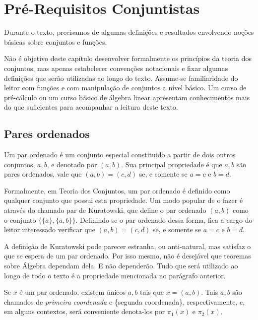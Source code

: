 
\chapter{Pré-Requisitos Conjuntistas}
Durante o texto, precisamos de algumas definições e resultados envolvendo noções básicas sobre conjuntos e funções.

Não é objetivo deste capítulo desenvolver formalmente os princípios da teoria dos conjuntos, mas apenas estabelecer convenções notacionais e fixar algumas definições que serão utilizadas ao longo do texto. Assume-se familiaridade do leitor com funções e com manipulação de conjuntos a nível básico.
Um curso de pré-cálculo ou um curso básico de álgebra linear apresentam conhecimentos mais do que suficientes para acompanhar a leitura deste texto.

\section{Pares ordenados}
Um par ordenado é um conjunto especial constituido a partir de dois outros conjuntos, $a, b$, e denotado por $(a, b)$.
Sua principal propriedade é que $a, b$ são pares ordenados, vale que $(a, b)=(c, d)$ se, e somente se $a=c$ e $b=d$.

Formalmente, em Teoria dos Conjuntos, um par ordenado é definido como qualquer conjunto que possui esta propriedade.
Um modo popular de o fazer é através do chamado par de Kuratowski, que define o par ordenado $(a, b)$ como o conjunto $\{\{a\}, \{a, b\}\}$.
Definindo-se o par ordenado dessa forma, fica a cargo do leitor interessado verificar que $(a, b)=(c, d)$ se, e somente se $a=c$ e $b=d$.

A definição de Kuratowski pode parecer estranha, ou anti-natural, mas satisfaz o que se espera de um par ordenado.
Por isso mesmo, não é desejável que teoremas sobre Álgebra dependam dela. E não dependerão. Tudo que será utilizado ao longo de todo o texto é a propriedade mencionada no parágrafo anterior.

Se $x$ é um par ordenado, existem únicos $a, b$ tais que $x=(a, b)$.
Tais $a, b$ são chamados de \emph{primeira coordenada} e \{segunda coordenada\}, respectivamente, e, em alguns contextos, será conveniente denota-los por $\pi_1(x)$ e $\pi_2(x)$.

